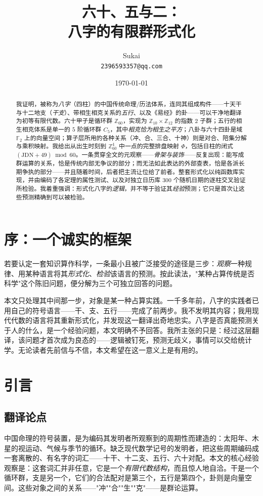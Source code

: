 \documentclass[11pt,a4paper,fontset=none]{ctexart}
\title{\textbf{六十、五与二：\\ 八字的有限群形式化}}
\author{Sukai\\ \texttt{2396593357@qq.com}}
\date{\today}
\theoremstyle{definition}
\theoremstyle{remark}
\newcommand{\Z}{\mathbb{Z}}
\newcommand{\F}{\mathbb{F}}
\begin{document}
\maketitle

\begin{abstract}
我证明，被称为\emph{八字}（四柱）的中国传统命理/历法体系，连同其组成构件——十天干与十二地支（\emph{干支}）、带相生相克关系的\emph{五行}、以及《易经》的卦——可以干净地翻译为初等有限代数。六十甲子是循环群 $\Z_{60}$，实现为 $\Z_{10}\times\Z_{12}$ 的指数 $2$ 子群；五行的相生相克体系是单一的 $5$ 阶循环群 $C_5$，其中\emph{相克恰为相生之平方}；八卦与六十四卦是域 $\F_2$ 上的向量空间；算子层所用的各种关系（冲、合、三合、十神）则是对合、陪集分解与乘积映射。我给出从出生时刻到 $\Z_{60}^4$ 中一点的完整排盘映射 $\Phi$，包括日柱的闭式 $(\mathrm{JDN}+49)\bmod 60$。一条贯穿全文的元观察——\emph{骨架与装饰}——反复出现：能写成群运算的关系，恰是传统内部无争议的部分；而无法如此表达的外部查表，恰是各派长期争执的部分——并且随着时间，后者把主流让位给了前者。整套形式化以纯函数库实现，并由编码了各定理的属性测试、以及对独立日历库 $300$ 个随机日期的逐柱交叉验证所检验。我着重强调：形式化八字的\emph{逻辑}，并不等于验证其\emph{经验}预测；它只是首次让这些预测精确到可以被检验。
\end{abstract}

\newpage
\section*{序：一个诚实的框架}
若要认定一套知识算作科学，一条最小且被广泛接受的途径是三步：\emph{观察}一种规律、用某种语言将其\emph{形式化}、\emph{检验}该语言的预测。按此读法，"某种占算传统是否科学"这个陈旧问题，便分解为三个可独立回答的问题。

本文只处理其中间那一步，对象是某一种占算实践。一千多年前，八字的实践者已用自己的符号语言——干、支、五行——完成了前两步。我不发明其内容；我用现代代数的语言将其重新形式化，并发现这一翻译出奇地忠实。八字是否真能预测关于人的什么，是一个经验问题，本文明确不予回答。我所主张的只是：经过这层翻译，该问题才首次成为良态的——逻辑被钉死，预测无歧义，事情可以交给统计学。无论读者先前信与不信，本文希望在这一意义上是有用的。

\newpage
\tableofcontents

\newpage
\section{引言}

\subsection{翻译论点}
中国命理的符号装置，是为编码其发明者所观察到的周期性而建造的：太阳年、木星的视运动、气候与季节的循环。缺乏现代数学记号的发明者，把这些周期编码成一套离散的、有名字的词汇——十干、十二支、五行、六十对配。本文的核心经验观察是：这套词汇并非任意，它是一个\emph{有限代数结构}，而且惊人地自洽。干是一个循环群，支是另一个，它们的合法配对是第三个，五行是第四个，卦则是向量空间。这些对象之间的关系——"冲""合""生""克"——是群论运算。
\end{document}
